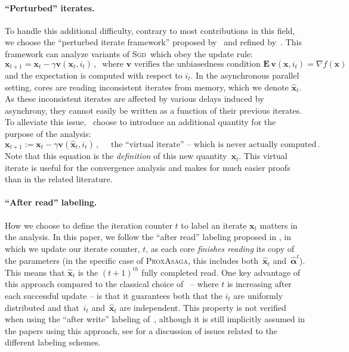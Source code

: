 \documentclass{article}
\newcommand{\Econd}{\mathbf{E}}
\newcommand{\PASAGA}{\textsc{ProxAsaga}}
\newcommand{\SGD}{\textsc{Sgd}}
\def\xx{{\boldsymbol x}}
\def\vv{{\boldsymbol v}}
\begin{document}
\paragraph{``Perturbed'' iterates.}
To handle this additional difficulty, contrary to most contributions in this field, we choose the ``perturbed iterate framework'' proposed by~\citet{mania2015perturbed} and refined by~\citet{leblond2016Asaga}.
%
This framework can  analyze variants of \SGD\ which obey the update rule:
\begin{equation*}
\xx_{t+1} = \xx_t - \gamma \vv(\xx_t, i_t)\, ,~\text{ where $\vv$ verifies the unbiasedness condition $\Econd\, \vv(\xx, i_t) = \nabla f(\xx)$}
\end{equation*}
and the expectation is computed with respect to $i_t$.
In the asynchronous parallel setting, cores are reading inconsistent iterates from memory, which we denote $\hat{\xx}_t$.
As these inconsistent iterates are affected by various delays induced by asynchrony, they cannot easily be written as a function of their previous iterates.
To alleviate this issue,~\citet{mania2015perturbed} choose to introduce an additional quantity for the purpose of the analysis:
\begin{equation}
\xx_{t+1} := \xx_t - \gamma \vv(\hat \xx_t, i_t)\,, \quad\text{ the ``virtual iterate'' -- which is never actually computed}\, .
\end{equation}
Note that this equation is the \textit{definition} of this new quantity~$\xx_t$.
This virtual iterate is useful for the convergence analysis and makes for much easier proofs than in the related literature.

\paragraph{``After read'' labeling.}
How we choose to define the iteration counter $t$ to label an iterate $\xx_t$ matters in the analysis.
In this paper, we follow the ``after read'' labeling proposed in \citet{leblond2016Asaga}, in which
we update our iterate counter, $t$, as each core \emph{finishes reading} its copy of the parameters (in the specific case of \PASAGA, this includes both~$\hat \xx_t$ and~$\hat {\boldsymbol\alpha}^t$).
This means that $\hat \xx_t$ is the $(t+1)^{th}$ fully completed read.
One key advantage of this approach compared to the classical choice of~\citet{hogwild2011} -- where $t$ is increasing after each successful update -- is that it guarantees both that the $i_t$ are uniformly distributed and that~$i_t$ and~$\hat \xx_t$ are independent.
This property is not verified when using the ``after write'' labeling of~\citet{hogwild2011}, although it is still implicitly assumed in the papers using this approach, see \citet[Section 3.2]{leblond2016Asaga} for a discussion of issues related to the different labeling schemes.
%
\end{document}
